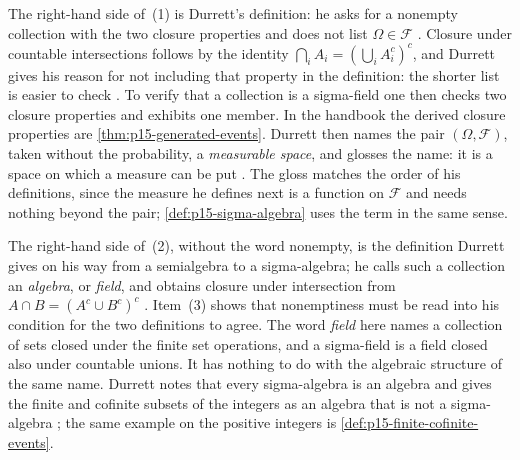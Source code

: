 The right-hand side of~(1) is Durrett's definition: he asks for a
nonempty collection with the two closure properties and does not list
\(\Omega\in\mathcal F\) \cite[sec.~1.1, p.~1]{DurrettPTEAuthor2019}.
Closure under countable intersections follows by the identity
\(\bigcap_iA_i=(\bigcup_iA_i^c)^c\), and Durrett gives his reason for not
including that property in the definition: the shorter list is easier to
check \cite[p.~1]{DurrettPTEAuthor2019}. To verify that a collection
is a sigma-field one then checks two closure properties and exhibits one
member. In the handbook the derived closure properties are
\cref{thm:p15-generated-events}. Durrett then names the pair
\((\Omega,\mathcal F)\), taken without the probability, a
\emph{measurable space}, and glosses the name: it is a space on which a
measure can be put \cite[sec.~1.1, p.~1]{DurrettPTEAuthor2019}. The
gloss matches the order of his definitions, since the measure he defines
next is a function on \(\mathcal F\) and needs nothing beyond the pair;
\cref{def:p15-sigma-algebra} uses the term in the same sense.

The right-hand side of~(2), without the word nonempty, is the
definition Durrett gives on his way from a semialgebra to a
sigma-algebra; he calls such a collection an \emph{algebra}, or
\emph{field}, and obtains closure under intersection from
\(A\cap B=(A^c\cup B^c)^c\) \cite[sec.~1.1, p.~4]{DurrettPTEAuthor2019}.
Item~(3) shows that nonemptiness must be read into his condition for the
two definitions to agree. The word \emph{field} here names a collection of sets
closed under the finite set operations, and a sigma-field is a field
closed also under countable unions. It has nothing to do with the
algebraic structure of the same name. Durrett notes that every
sigma-algebra is an algebra and gives the finite and cofinite subsets of
the integers as an algebra that is not a sigma-algebra
\cite[Example~1.1.6, p.~4]{DurrettPTEAuthor2019}; the same example on
the positive integers is \cref{def:p15-finite-cofinite-events}.


